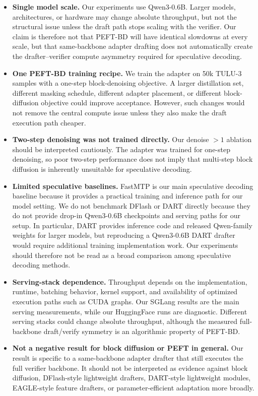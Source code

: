 \documentclass[11pt]{article}
\begin{document}
\begin{itemize}
    \item \textbf{Single model scale.}
    Our experiments use Qwen3-0.6B. Larger models, architectures, or hardware may change absolute throughput, but not the structural issue unless the draft path stops scaling with the verifier. Our claim is therefore not that PEFT-BD will have identical slowdowns at every scale, but that same-backbone adapter drafting does not automatically create the drafter--verifier compute asymmetry required for speculative decoding.

    \item \textbf{One PEFT-BD training recipe.}
    We train the adapter on 50k TULU-3 samples with a one-step block-denoising objective. A larger distillation set, different masking schedule, different adapter placement, or different block-diffusion objective could improve acceptance. However, such changes would not remove the central compute issue unless they also make the draft execution path cheaper.

    \item \textbf{Two-step denoising was not trained directly.}
    Our denoise $>1$ ablation should be interpreted cautiously. The adapter was trained for one-step denoising, so poor two-step performance does not imply that multi-step block diffusion is inherently unsuitable for speculative decoding.

    \item \textbf{Limited speculative baselines.}
    FastMTP is our main speculative decoding baseline because it provides a practical training and inference path for our model setting. We do not benchmark DFlash or DART directly because they do not provide
drop-in Qwen3-0.6B checkpoints and serving paths for our setup. In
particular, DART provides inference code and released Qwen-family weights
for larger models, but reproducing a Qwen3-0.6B DART drafter would
require additional training implementation work. Our experiments should
therefore not be read as a broad comparison among speculative decoding
methods.

    \item \textbf{Serving-stack dependence.}
    Throughput depends on the implementation, runtime, batching behavior, kernel support, and availability of optimized execution paths such as CUDA graphs. Our SGLang results are the main serving measurements, while our HuggingFace runs are diagnostic. Different serving stacks could change absolute throughput, although the measured full-backbone draft/verify symmetry is an algorithmic property of PEFT-BD.
    \\

    \item \textbf{Not a negative result for block diffusion or PEFT in general.}
    Our result is specific to a same-backbone adapter drafter that still executes the full verifier backbone. It should not be interpreted as evidence against block diffusion, DFlash-style lightweight drafters, DART-style lightweight modules, EAGLE-style feature drafters, or parameter-efficient adaptation more broadly.
\end{itemize}
\end{document}
